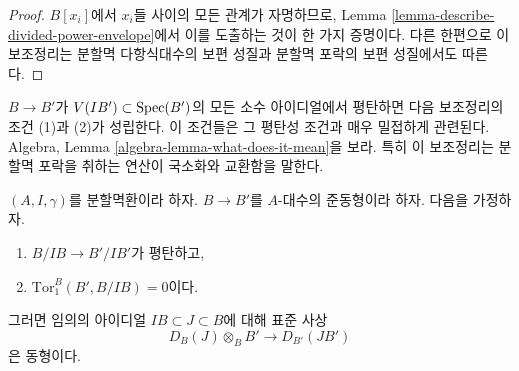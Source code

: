 \begin{proof}
$B[x_i]$에서 $x_i$들 사이의 모든 관계가 자명하므로,
Lemma \ref{lemma-describe-divided-power-envelope}에서 이를 도출하는 것이
한 가지 증명이다. 다른 한편으로 이 보조정리는 분할멱 다항식대수의
보편 성질과 분할멱 포락의 보편 성질에서도 따른다.
\end{proof}

\noindent
$B \to B'$가 $V(IB') \subset \mathop{\mathrm{Spec}}(B')$의 모든 소수 아이디얼에서
평탄하면 다음 보조정리의 조건 (1)과 (2)가 성립한다. 이 조건들은
그 평탄성 조건과 매우 밀접하게 관련된다. Algebra, Lemma
\ref{algebra-lemma-what-does-it-mean}을 보라.
특히 이 보조정리는 분할멱 포락을 취하는 연산이 국소화와 교환함을 말한다.

\begin{lemma}
\label{lemma-flat-base-change-divided-power-envelope}
$(A, I, \gamma)$를 분할멱환이라 하자.
$B \to B'$를 $A$-대수의 준동형이라 하자. 다음을 가정하자.
\begin{enumerate}
\item $B/IB \to B'/IB'$가 평탄하고,
\item $\text{Tor}_1^B(B', B/IB) = 0$이다.
\end{enumerate}
그러면 임의의 아이디얼 $IB \subset J \subset B$에 대해 표준 사상
$$
D_B(J) \otimes_B B' \longrightarrow D_{B'}(JB')
$$
은 동형이다.
\end{lemma}

